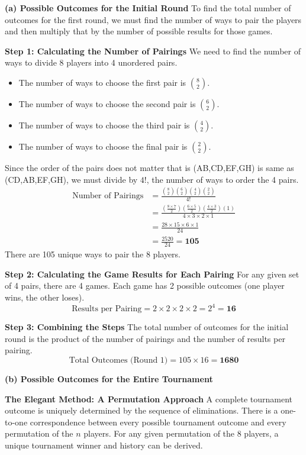 \begin{solutionbox}
    \textbf{(a) Possible Outcomes for the Initial Round}
To find the total number of outcomes for the first round, we must find the number of ways to pair the players and then multiply that by the number of possible results for those games.

\textbf{Step 1: Calculating the Number of Pairings}
We need to find the number of ways to divide 8 players into 4 unordered pairs.
\begin{itemize}
    \item The number of ways to choose the first pair is $\binom{8}{2}$.
    \item The number of ways to choose the second pair is $\binom{6}{2}$.
    \item The number of ways to choose the third pair is $\binom{4}{2}$.
    \item The number of ways to choose the final pair is $\binom{2}{2}$.
\end{itemize}
Since the order of the pairs does not matter that is (AB,CD,EF,GH) is same as (CD,AB,EF,GH), we must divide by $4!$, the number of ways to order the 4 pairs.
\begin{align*}
    \text{Number of Pairings} &= \frac{\binom{8}{2} \binom{6}{2} \binom{4}{2} \binom{2}{2}}{4!} \\
    &= \frac{\left(\frac{8 \times 7}{2}\right) \left(\frac{6 \times 5}{2}\right) \left(\frac{4 \times 3}{2}\right) \left(1\right)}{4 \times 3 \times 2 \times 1} \\
    &= \frac{28 \times 15 \times 6 \times 1}{24} \\
    &= \frac{2520}{24} = \mathbf{105}
\end{align*}
There are 105 unique ways to pair the 8 players.

\textbf{Step 2: Calculating the Game Results for Each Pairing}
For any given set of 4 pairs, there are 4 games. Each game has 2 possible outcomes (one player wins, the other loses).
\[
\text{Results per Pairing} = 2 \times 2 \times 2 \times 2 = 2^4 = \mathbf{16}
\]

\textbf{Step 3: Combining the Steps}
The total number of outcomes for the initial round is the product of the number of pairings and the number of results per pairing.
\[
\text{Total Outcomes (Round 1)} = 105 \times 16 = \mathbf{1680}
\]

\textbf{(b) Possible Outcomes for the Entire Tournament}

\textbf{The Elegant Method: A Permutation Approach}
A complete tournament outcome is uniquely determined by the sequence of eliminations. There is a one-to-one correspondence between every possible tournament outcome and every permutation of the $n$ players. For any given permutation of the 8 players, a unique tournament winner and history can be derived.


\end{solutionbox}
